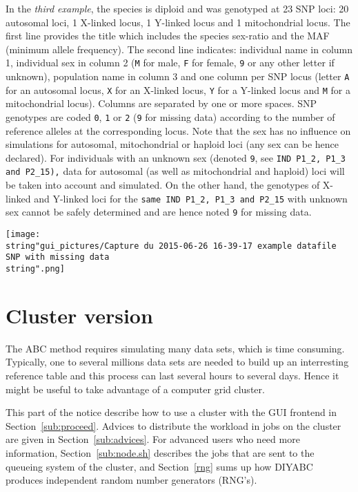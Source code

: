 In the \textit{third example}, the species is diploid and was genotyped
at 23 SNP loci: 20 autosomal loci, 1 X-linked locus, 1 Y-linked locus
and 1 mitochondrial locus. The first line provides the title which
includes the species sex-ratio and the MAF (minimum allele frequency).
The second line indicates: individual name in column 1, individual
sex in column 2 (\texttt{M} for male, \texttt{F} for female, \texttt{9}
or any other letter if unknown), population name in column 3 and one
column per SNP locus (letter \texttt{A} for an autosomal locus, \texttt{X}
for an X-linked locus, \texttt{Y} for a Y-linked locus and \texttt{M}
for a mitochondrial locus). Columns are separated by one or more spaces.
SNP genotypes are coded \texttt{0}, \texttt{1} or \texttt{2} (\texttt{9}
for missing data) according to the number of reference alleles at
the corresponding locus. Note that the sex has no influence on simulations
for autosomal, mitochondrial or haploid loci (any sex can be hence
declared). For individuals with an unknown sex (denoted \texttt{9},
see \texttt{IND P1\_2, P1\_3 and P2\_15),} data for autosomal (as
well as mitochondrial and haploid) loci will be taken into account
and simulated. On the other hand, the genotypes of X-linked and Y-linked
loci for the \texttt{same IND P1\_2, P1\_3 and P2\_15} with unknown
sex cannot be safely determined and are hence noted \texttt{9} for
missing data.

\texttt{[image: \\string"gui\_pictures/Capture du 2015-06-26 16-39-17 example datafile SNP with missing data\\string".png]}

\clearpage{}


\section{Cluster version}

\label{cluster} The ABC method requires simulating many data sets,
which is time consuming. Typically, one to several millions data sets
are needed to build up an interresting reference table and this process
can last several hours to several days. Hence it might be useful to
take advantage of a computer grid cluster.

This part of the notice describe how to use a cluster with the GUI
frontend in Section~\ref{sub:proceed}. Advices to distribute the
workload in jobs on the cluster are given in Section~\ref{sub:advices}.
For advanced users who need more information, Section~\ref{sub:node.sh}
describes the jobs that are sent to the queueing system of the cluster,
and Section~\ref{rng} sums up how DIYABC produces independent random
number generators (RNG's).


